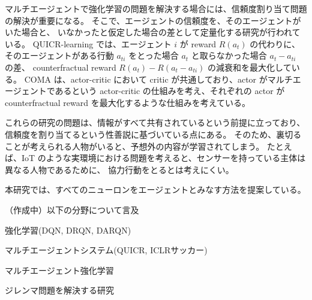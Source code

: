 マルチエージェントで強化学習の問題を解決する場合には、信頼度割り当て問題の解決が重要になる。
そこで、エージェントの信頼度を、そのエージェントがいた場合と、
いなかったと仮定した場合の差として定量化する研究が行われている。
QUICR-learning \citep{agogino2006quicr} では、エージェント $i$ が reward $R(a_t)$ の代わりに、
そのエージェントがある行動 $a_{ti}$ をとった場合 $a_t$ と取らなかった場合 $a_t-a_{ti}$ の差、
counterfractual reward $R(a_t) - R(a_t - a_{ti})$ の減衰和を最大化している。
COMA \citep{foerster2017counterfactual} は、actor-critic において critic が共通しており、actor がマルチエージェントであるという actor-critic の仕組みを考え、それぞれの actor が counterfractual reward を最大化するような仕組みを考えている。

これらの研究の問題は、情報がすべて共有されているという前提に立っており、
信頼度を割り当てるという性善説に基づいている点にある。
そのため、裏切ることが考えられる人物がいると、予想外の内容が学習されてしまう。
たとえば、IoT のような実環境における問題を考えると、センサーを持っている主体は異なる人物であるために、
協力行動をとるとは考えにくい。

本研究では、すべてのニューロンをエージェントとみなす方法を提案している。


（作成中）以下の分野について言及

強化学習(DQN, DRQN, DARQN)

マルチエージェントシステム(QUICR, ICLRサッカー)

マルチエージェント強化学習

ジレンマ問題を解決する研究
\fi
